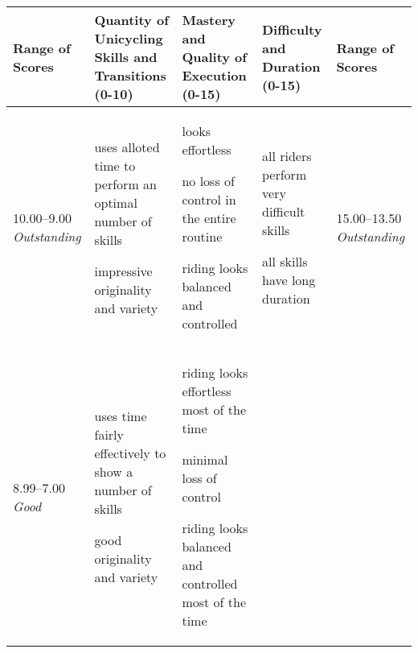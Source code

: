\begin{minipage}{\textwidth}
\begingroup
    \fontsize{7pt}{9pt}\selectfont
\setlength{\LTleft}{-2.5cm} 
\begin{longtable}{|p{1.5cm}|p{5cm}|p{5cm}|p{5cm}|p{1.5cm}|}
\hline
\textbf{Range of Scores} &
\textbf{Quantity of Unicycling Skills and \newline Transitions (0-10)} &
\textbf{Mastery and Quality of Execution \newline (0-15)} &
\textbf{Difficulty and Duration \newline (0-15)} &
\textbf{Range of Scores} \\
\hline
10.00--9.00 \newline
\emph{Outstanding} &

\begin{judging_items}%
\item uses alloted time to perform an optimal number of skills
\item impressive originality and variety
\end{judging_items} &

\begin{judging_items}%
\item looks effortless
\item no loss of control in the entire routine
\item riding looks balanced and controlled
\end{judging_items} &

\begin{judging_items}%
\item all riders perform very difficult skills
\item all skills have long duration
\end{judging_items} &

15.00--13.50 \newline
\emph{Outstanding} \\
\hline

8.99--7.00 \newline
\emph{Good} &

\begin{judging_items}%
\item uses time fairly effectively to show a number of skills
\item good originality and variety
\end{judging_items} &

\begin{judging_items}%
\item riding looks effortless most of the time
\item minimal loss of control
\item riding looks balanced and controlled most of the time
\end{judging_items} &


\end{longtable}
\end{minipage}
